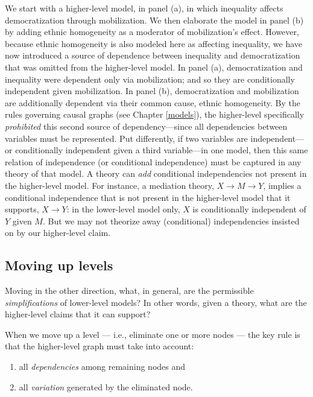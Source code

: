 \documentclass[
  12pt,
]{book}
\providecommand{\tightlist}{%
  \setlength{\itemsep}{0pt}\setlength{\parskip}{0pt}}
\begin{document}
We start with a higher-level model, in panel (a), in which inequality affects democratization through mobilization. We then elaborate the model in panel (b) by adding ethnic homogeneity as a moderator of mobilization's effect. However, because ethnic homogeneity is also modeled here as affecting inequality, we have now introduced a source of dependence between inequality and democratization that was omitted from the higher-level model. In panel (a), democratization and inequality were dependent only via mobilization; and so they are conditionally independent given mobilization. In panel (b), democratization and mobilization are additionally dependent via their common cause, ethnic homogeneity. By the rules governing causal graphs (see Chapter \ref{models}), the higher-level specifically \emph{prohibited} this second source of dependency---since all dependencies between variables must be represented.
Put differently, if two variables are independent--- or conditionally independent given a third variable---in one model, then this same relation of independence (or conditional independence) must be captured in any theory of that model. A theory can \emph{add} conditional independencies not present in the higher-level model. For instance, a mediation theory, \(X \rightarrow M \rightarrow Y\), implies a conditional independence that is not present in the higher-level model that it supports, \(X \rightarrow Y\): in the lower-level model only, \(X\) is conditionally independent of \(Y\) given \(M\). But we may not theorize away (conditional) independencies insisted on by our higher-level claim.

\hypertarget{moving-up-levels}{%
\subsection{Moving up levels}\label{moving-up-levels}}

Moving in the other direction, what, in general, are the permissible \emph{simplifications} of lower-level models? In other words, given a theory, what are the higher-level claims that it can support?

When we move up a level --- i.e., eliminate one or more nodes --- the key rule is that the higher-level graph must take into account:

\begin{enumerate}
\def\labelenumi{(\alph{enumi})}
\tightlist
\item
  all \emph{dependencies} among remaining nodes and
\item
  all \emph{variation} generated by the eliminated node.
\end{enumerate}
\end{document}
